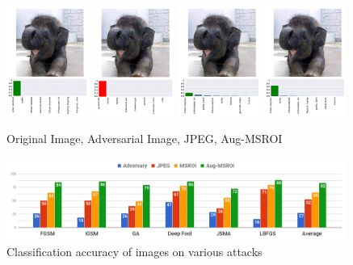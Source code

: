 \begin{figure}[H]
   \centering
     \includegraphics[width=0.24\textwidth,angle=0]{figures/protect/ori.pdf}
     \includegraphics[width=0.24\textwidth,angle=0]{figures/protect/adv.pdf}
     \includegraphics[width=0.24\textwidth,angle=0]{figures/protect/jpg.pdf}
     \includegraphics[width=0.24\textwidth,angle=0]{figures/protect/msroi.pdf}
              \caption{Original Image, Adversarial Image, JPEG, Aug-MSROI }
     \label{fig:compare}
 \end{figure}
 
 
 \begin{figure}[H]
     \centering
     \includegraphics[width=0.99\textwidth,angle=0]{figures/protect/results.png}
     \caption{Classification accuracy of images on various attacks}
     \vspace{-5mm}
     \label{fig:numbers}
     \end{figure}

